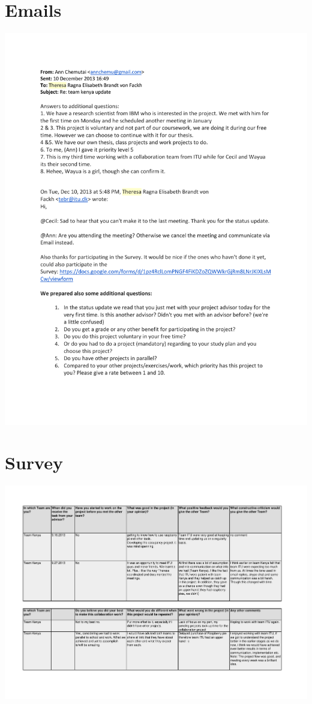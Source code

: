 \section{Emails} \label{sec:Emails}
\includegraphics[scale=0.75,angle=90]{appendix/Email_20131210.pdf}

\section{Survey}\label{sec:survey_result}
\includegraphics[scale=0.75,angle=90]{appendix/Survey_Answers_from_Team_Kenya.pdf}